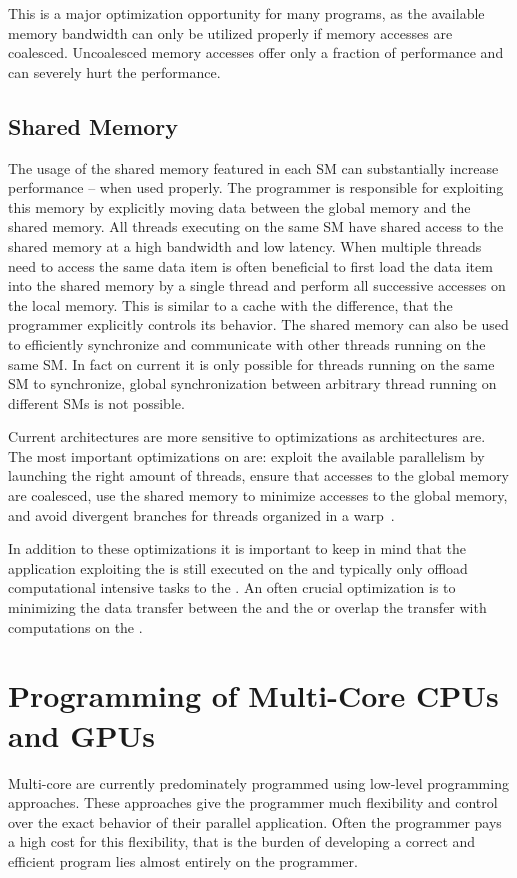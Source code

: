 This is a major optimization opportunity for many \GPU programs, as the available memory bandwidth can only be utilized properly if memory accesses are coalesced.
Uncoalesced memory accesses offer only a fraction of performance and can severely hurt the performance.


\subsection*{\GPU Shared Memory}
The usage of the shared memory featured in each SM can substantially increase performance -- when used properly.
The programmer is responsible for exploiting this memory by explicitly moving data between the global memory and the shared memory.
All threads executing on the same SM have shared access to the shared memory at a high bandwidth and low latency.
When multiple threads need to access the same data item is often beneficial to first load the data item into the shared memory by a single thread and perform all successive accesses on the local memory.
This is similar to a cache with the difference, that the programmer explicitly controls its behavior.
The shared memory can also be used to efficiently synchronize and communicate with other threads running on the same SM.
In fact on current \GPUs it is only possible for threads running on the same SM to synchronize, global synchronization between arbitrary thread running on different SMs is not possible.

\bigskip
Current \GPU architectures are more sensitive to optimizations as \CPU architectures are.
The most important optimizations on \GPUs are:
exploit the available parallelism by launching the right amount of threads, ensure that accesses to the global memory are coalesced, use the shared memory to minimize accesses to the global memory, and avoid divergent branches for threads organized in a warp~\cite{CUDATuningKepler2015}.

In addition to these optimizations it is important to keep in mind that the application exploiting the \GPU is still executed on the \CPU and typically only offload computational intensive tasks to the \GPU.
An often crucial optimization is to minimizing the data transfer between the \CPU and the \GPU or overlap the transfer with computations on the \GPU.

\section{Programming of Multi-Core CPUs and GPUs}
Multi-core \CPUs are currently predominately programmed using low-level programming approaches.
These approaches give the programmer much flexibility and control over the exact behavior of their parallel application.
Often the programmer pays a high cost for this flexibility, that is the burden of developing a correct and efficient program lies almost entirely on the programmer.

